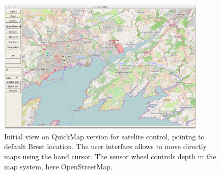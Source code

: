 \begin{figure}
\begin{center}
\includegraphics[width=10cm]{QuickMapSatBrest.png}
\caption{Initial view on QuickMap version for satelite control,
pointng to default Brest location. The user interface allows to move directly maps using
the hand cursor. The sensor wheel controls depth in the map system, here OpenStreetMap.}
\label{fig:initialQuickMapBrest}
\end{center}
\end{figure}



